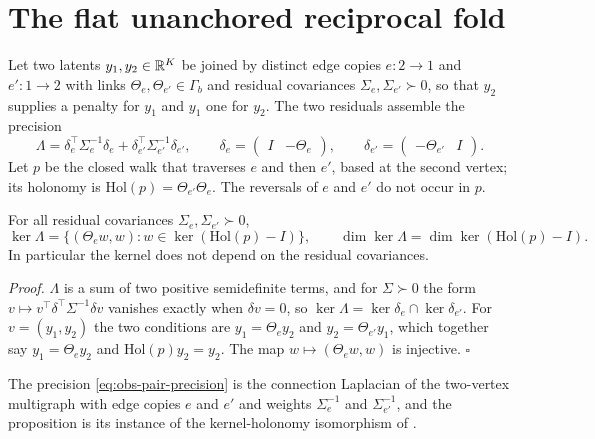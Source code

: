 \section{The flat unanchored reciprocal fold}
\label{sec:obs-cycle}

Let two latents \(y_1,y_2\in\mathbb R^K\) be joined by distinct edge copies \(e:2\to1\) and
\(e':1\to2\) with links \(\Theta_e,\Theta_{e'}\in\Gamma_b\) and residual covariances
\(\Sigma_e,\Sigma_{e'}\succ0\), so that \(y_2\) supplies a penalty for \(y_1\) and \(y_1\) one
for \(y_2\). The two residuals assemble the precision
\begin{equation}
\Lambda=\delta_e^\top\Sigma_e^{-1}\delta_e+\delta_{e'}^\top\Sigma_{e'}^{-1}\delta_{e'},
\qquad
\delta_e=\begin{pmatrix}I&-\Theta_e\end{pmatrix},
\qquad
\delta_{e'}=\begin{pmatrix}-\Theta_{e'}&I\end{pmatrix}.
\label{eq:obs-pair-precision}
\end{equation}
Let \(p\) be the closed walk that traverses \(e\) and then \(e'\), based at the second
vertex; its holonomy is \(\mathrm{Hol}(p)=\Theta_{e'}\Theta_e\). The reversals of \(e\) and
\(e'\) do not occur in \(p\).

For all residual covariances \(\Sigma_e,\Sigma_{e'}\succ0\),
\begin{equation}
\ker\Lambda=\bigl\{(\Theta_ew,w):w\in\ker(\mathrm{Hol}(p)-I)\bigr\},
\qquad
\dim\ker\Lambda=\dim\ker(\mathrm{Hol}(p)-I).
\label{eq:obs-pair-kernel}
\end{equation}
In particular the kernel does not depend on the residual covariances. 

\noindent\emph{Proof.}
\(\Lambda\) is a sum of two positive semidefinite terms, and for \(\Sigma\succ0\) the form
\(v\mapsto v^\top\delta^\top\Sigma^{-1}\delta v\) vanishes exactly when \(\delta v=0\), so
\(\ker\Lambda=\ker\delta_e\cap\ker\delta_{e'}\). For \(v=(y_1,y_2)\) the two conditions are
\(y_1=\Theta_ey_2\) and \(y_2=\Theta_{e'}y_1\), which together say \(y_1=\Theta_ey_2\) and
\(\mathrm{Hol}(p)y_2=y_2\). The map \(w\mapsto(\Theta_ew,w)\) is injective. \hfill$\square$

\medskip
The precision \eqref{eq:obs-pair-precision} is the connection Laplacian of the two-vertex
multigraph with edge copies \(e\) and \(e'\) and weights \(\Sigma_e^{-1}\) and
\(\Sigma_{e'}^{-1}\), and the proposition is its instance of the kernel-holonomy
isomorphism of .

